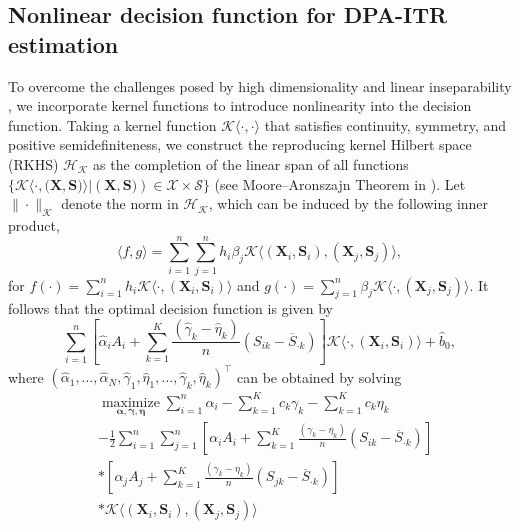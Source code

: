 \documentclass[12pt]{article}
\theoremstyle{plain}
\theoremstyle{definition}
\theoremstyle{remark}
\begin{document}
\subsection{Nonlinear decision function for DPA-ITR estimation}

To overcome the challenges posed by high dimensionality and linear inseparability \citep{zhao2012estimating}, we incorporate kernel functions to introduce nonlinearity into the decision function. Taking a kernel function $\mathcal{K}\langle \cdot,\cdot \rangle$ that satisfies continuity, symmetry, and positive semidefiniteness, we construct the reproducing kernel Hilbert space (RKHS) $\mathcal{H}_{\mathcal{K}}$ as the completion of the linear span of all functions $\{\mathcal{K}\langle \cdot,(\boldsymbol{X},\boldsymbol{S)}\rangle| (\boldsymbol{X},\boldsymbol{S)}) \in \mathcal{X}\times\mathcal{S}\}$ (see Moore–Aronszajn Theorem in \cite{aronszajn1950theory}). Let $\|\cdot\|_{\mathcal{K}}$ denote the norm in $\mathcal{H}_{\mathcal{K}}$, which can be induced by the following inner product,
$$
\langle f, g\rangle=\sum_{i=1}^n \sum_{j=1}^n h_i \beta_j \mathcal{K}\langle(\boldsymbol{X}_i,\boldsymbol{S}_i),(\boldsymbol{X}_j,\boldsymbol{S}_j)\rangle,
$$
for $f(\cdot)=\sum_{i=1}^n h_i \mathcal{K}\langle \cdot, (\boldsymbol{X}_i,\boldsymbol{S}_i)\rangle$ and $g(\cdot)=\sum_{j=1}^n \beta_j \mathcal{K}\langle \cdot, (\boldsymbol{X}_j,\boldsymbol{S}_j)\rangle$.
It follows that the optimal decision function is given by
$$
\sum_{i=1}^n[\widehat{\alpha}_i A_i +\sum_{k=1}^K\frac{(\widehat{\gamma}_k-\widehat{\eta}_k)}{n}({S}_{ik}-\overline{S}_{\cdot k})]  \mathcal{K}\langle \cdot, (\boldsymbol{X}_i,\boldsymbol{S}_i)\rangle+\widehat{b}_0,
$$
where $\left(\widehat{\alpha}_1, \ldots, \widehat{\alpha}_N,\widehat{\gamma}_1,\widehat{\eta}_1,  \ldots, \widehat{\gamma}_k,\widehat{\eta}_k \right)^\top$ can be obtained by  solving
\begin{equation}
\label{e15}
\begin{aligned}
&\underset{\boldsymbol{\alpha},  \boldsymbol{\gamma},  \boldsymbol{\eta}}{\operatorname{maximize}}
\sum_{i=1}^n \alpha_i
-\sum_{k=1}^Kc_k\gamma_k
-\sum_{k=1}^Kc_k\eta_k\\
&-\frac{1}{2}\sum_{i=1}^n\sum_{j=1}^n[\alpha_i A_i +\sum_{k=1}^K\frac{(\gamma_k-\eta_k)}{n}({S}_{ik}-\overline{S}_{\cdot k})]\\
&*[\alpha_j A_j +\sum_{k=1}^K\frac{(\gamma_k-\eta_k)}{n}(S_{jk}-\overline{S}_{\cdot k})]\\
&* \mathcal{K}\langle(\boldsymbol{X}_i,\boldsymbol{S}_i),(\boldsymbol{X}_j,\boldsymbol{S}_j) \rangle
\end{aligned}
\end{equation}
\end{document}
